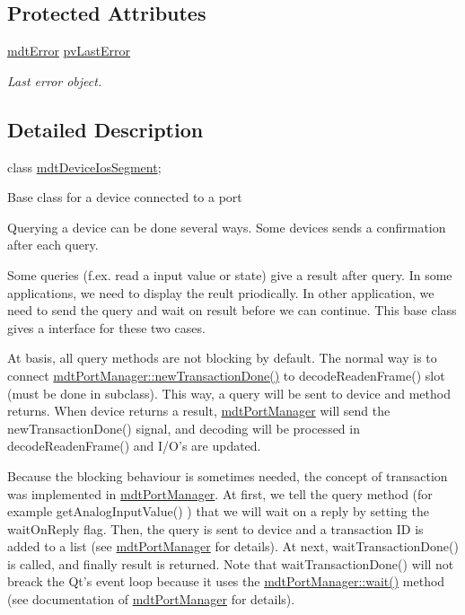\subsection*{Protected Attributes}
\begin{DoxyCompactItemize}
\item 
\hyperlink{classmdt_error}{mdt\-Error} \hyperlink{classmdt_device_ab54221195bbf9363f7e7f10ef38a3909}{pv\-Last\-Error}
\begin{DoxyCompactList}\small\item\em Last error object. \end{DoxyCompactList}\end{DoxyCompactItemize}


\subsection{Detailed Description}
class \hyperlink{classmdt_device_ios_segment}{mdt\-Device\-Ios\-Segment}; 

Base class for a device connected to a port

Querying a device can be done several ways. Some devices sends a confirmation after each query.

Some queries (f.\-ex. read a input value or state) give a result after query. In some applications, we need to display the reult priodically. In other application, we need to send the query and wait on result before we can continue. This base class gives a interface for these two cases.

At basis, all query methods are not blocking by default. The normal way is to connect \hyperlink{classmdt_port_manager_a416a24db1048e9f66aef27ea810954d2}{mdt\-Port\-Manager\-::new\-Transaction\-Done()} to decode\-Readen\-Frame() slot (must be done in subclass). This way, a query will be sent to device and method returns. When device returns a result, \hyperlink{classmdt_port_manager}{mdt\-Port\-Manager} will send the new\-Transaction\-Done() signal, and decoding will be processed in decode\-Readen\-Frame() and I/\-O's are updated.

Because the blocking behaviour is sometimes needed, the concept of transaction was implemented in \hyperlink{classmdt_port_manager}{mdt\-Port\-Manager}. At first, we tell the query method (for example get\-Analog\-Input\-Value() ) that we will wait on a reply by setting the wait\-On\-Reply flag. Then, the query is sent to device and a transaction I\-D is added to a list (see \hyperlink{classmdt_port_manager}{mdt\-Port\-Manager} for details). At next, wait\-Transaction\-Done() is called, and finally result is returned. Note that wait\-Transaction\-Done() will not breack the Qt's event loop because it uses the \hyperlink{classmdt_port_manager_aaa85e0200aba0e0f4392dfe01abae2cf}{mdt\-Port\-Manager\-::wait()} method (see documentation of \hyperlink{classmdt_port_manager}{mdt\-Port\-Manager} for details).

